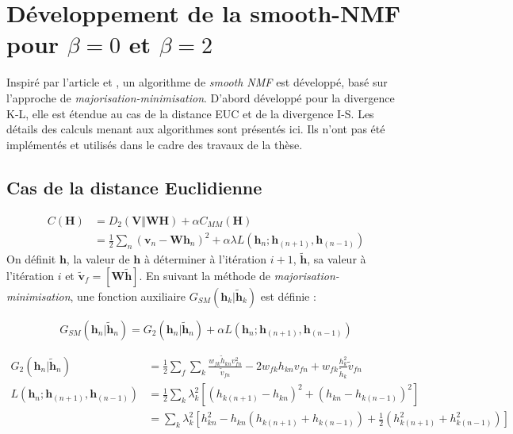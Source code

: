 \chapter{Développement de la smooth-NMF pour $\beta = 0$ et $\beta = 2$}\label{annex:smoothNMF}

Inspiré par l'article \cite{essid2013smooth} et \cite{fevotte_algorithms_2011}, un algorithme de \textit{smooth NMF} est développé, basé sur l'approche de \textit{majorisation-minimisation}. D'abord développé pour la divergence K-L, elle est étendue au cas de la distance EUC et de la divergence I-S. Les détails des calculs menant aux algorithmes sont présentés ici. Ils n'ont pas été implémentés et utilisés dans le cadre des travaux de la thèse.

\section{Cas de la distance Euclidienne}
\begin{align}
C(\mathbf{H}) &= D_2(\mathbf{V} \Vert \mathbf{WH}) + \alpha C_{MM}(\mathbf{H})\\
 &= \frac{1}{2}\sum_n(\mathbf{v}_n-\mathbf{Wh}_n)^2+\alpha\lambda L(\mathbf{h}_{n}; \mathbf{h}_{(n+1)}, \mathbf{h}_{(n-1)}) 
\end{align}
On définit $\mathbf{h}$, la valeur de $\mathbf{h}$ à déterminer à l'itération $i+1$, $\mathbf{\tilde{h}}$, sa valeur à l'itération $i$ et $\mathbf{\tilde{v}}_f = \left[\mathbf{W}\tilde{\textbf{h}}\right]$.
En suivant la méthode de \textit{majorisation-minimisation}, une fonction auxiliaire $G_{SM}(\mathbf{h}_{k}\vert \mathbf{\tilde{h}}_{k})$ est définie : 

\begin{equation}
G_{SM}(\mathbf{h}_{n}\vert \mathbf{\tilde{h}}_{n}) = G_{2}(\mathbf{h}_{n}\vert \mathbf{\tilde{h}}_{n})+\alpha L(\mathbf{h}_{n}; \mathbf{h}_{(n+1)}, \mathbf{h}_{(n-1)})
\end{equation}


\begin{align}
G_{2}(\mathbf{h}_{n}\vert \mathbf{\tilde{h}}_{n}) &= \frac{1}{2}\sum_{f} \sum_k \frac{w_{fk} \tilde{h}_{kn} v_{fn}^2}{\tilde{v}_{fn}}-2 w_{fk} h_{kn} v_{fn}+w_{fk}\frac{h_{k}^2}{\tilde{h}_{k}}\tilde{v}_{fn}
\\
L(\mathbf{h}_{n}; \mathbf{h}_{(n+1)}, \mathbf{h}_{(n-1)}) &= \frac{1}{2}\sum_{k}\lambda_k^2 \left[ \left(h_{k(n+1)}-h_{kn}\right)^2+\left(h_{kn}-h_{k(n-1)}\right)^2 \right]\\
&= \sum_k \lambda_k^2 \left[ h_{kn}^2- h_{kn}\left(h_{k(n+1)}+h_{k(n-1)}\right)+\frac{1}{2} \left(h_{k(n+1)}^2+h_{k(n-1)}^2\right) \right]
\end{align}
 
